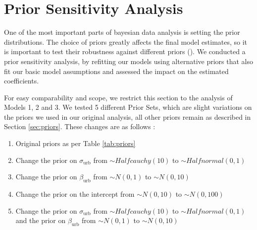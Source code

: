 \documentclass[12pt]{article}
\begin{document}




\section{Prior Sensitivity Analysis}


One of the most important parts of bayesian data analysis is setting the prior distributions. The choice of priors greatly affects the final model estimates, so it is important to test their robustness against different priors (\cite{PriorSensAnalysis}).
We conducted a prior sensitivity analysis, by refitting our models using alternative priors that also fit our basic model assumptions and assessed the impact on the estimated coefficients.

For easy comparability and scope, we restrict this section to the analysis of Models 1, 2 and 3.
We tested 5 different Prior Sets, which are slight variations on the priors we used in our original analysis, all other priors remain as described in Section \ref{sec:priors}. These changes are as follows :

\begin{enumerate}
    \item Original priors as per Table \ref{tab:priors}
    \item Change the prior on \(\sigma_\text{urb}\) from \(\sim Halfcauchy(10)\) to \(\sim Halfnormal(0, 1)\)
    \item Change  the prior on \(\beta_\text{urb}\) from \(\sim N(0, 1)\) to \(\sim N(0, 10)\)
    \item Change  the prior on the intercept from \(\sim N(0, 10)\) to \(\sim N(0, 100)\)
    \item Change the prior on \(\sigma_\text{urb}\) from \(\sim Halfcauchy(10)\) to \(\sim Halfnormal(0, 1)\) and the prior on \(\beta_\text{urb}\) from \(\sim N(0, 1)\) to \(\sim N(0, 10)\)
\end{enumerate}
\end{document}
